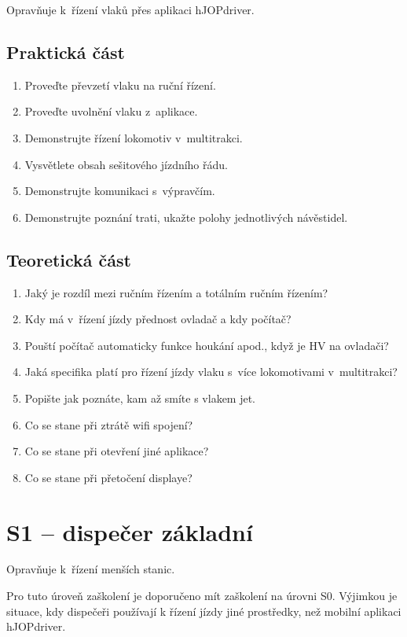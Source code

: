 \documentclass[12pt,a4paper]{article}
\begin{document}
Opravňuje k~řízení vlaků přes aplikaci hJOPdriver.

\subsection{Praktická část}

\begin{enumerate}[leftmargin=*]
\item Proveďte převzetí vlaku na ruční řízení.
\item Proveďte uvolnění vlaku z~aplikace.
\item Demonstrujte řízení lokomotiv v~multitrakci.
\item Vysvětlete obsah sešitového jízdního řádu.
\item Demonstrujte komunikaci s~výpravčím.
\item Demonstrujte poznání trati, ukažte polohy jednotlivých návěstidel.
\end{enumerate}

\subsection{Teoretická část}
\begin{enumerate}[leftmargin=*]
\item Jaký je rozdíl mezi ručním řízením a totálním ručním řízením?
\item Kdy má v~řízení jízdy přednost ovladač a kdy počítač?
\item Pouští počítač automaticky funkce houkání apod., když je HV na ovladači?
\item Jaká specifika platí pro řízení jízdy vlaku s~více lokomotivami v~multitrakci?
\item Popište jak poznáte, kam až smíte s vlakem jet.
\item Co se stane při ztrátě wifi spojení?
\item Co se stane při otevření jiné aplikace?
\item Co se stane při přetočení displaye?
\end{enumerate}

\newpage

\section{S1 – dispečer základní}

Opravňuje k~řízení menších stanic.

Pro tuto úroveň zaškolení je doporučeno mít zaškolení na úrovni S0. Výjimkou
je situace, kdy dispečeři používají k řízení jízdy jiné prostředky, než mobilní
aplikaci hJOPdriver.
\end{document}
